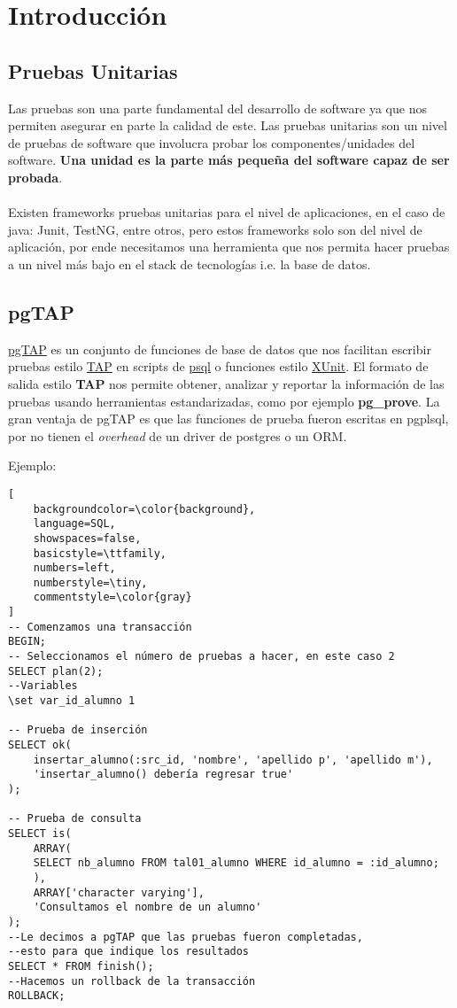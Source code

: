 \documentclass{article}
\begin{document}
\maketitle
\tableofcontents
\section{Introducción}

\subsection{Pruebas Unitarias}
Las pruebas son una parte fundamental del desarrollo de software ya que nos permiten asegurar en parte la calidad de este. Las pruebas unitarias son un nivel de pruebas de software que involucra probar los componentes/unidades del software. \textbf{Una unidad es la parte más pequeña del software capaz de ser probada}.\\\\
Existen frameworks pruebas unitarias para el nivel de aplicaciones, en el caso de java: Junit, TestNG, entre otros, pero estos frameworks solo son del nivel de aplicación, por ende necesitamos una herramienta que nos permita hacer pruebas a un nivel más bajo en el stack de tecnologías i.e. la base de datos.

\subsection{pgTAP}
\href{https://pgtap.org/documentation.html}{pgTAP} es un conjunto de funciones de base de datos que nos facilitan escribir pruebas estilo \href{https://en.wikipedia.org/wiki/Test_Anything_Protocol}{TAP} en scripts de \href{https://www.postgresql.org/docs/9.6/app-psql.html}{psql} o funciones estilo \href{https://en.wikipedia.org/wiki/XUnit}{XUnit}. El formato de salida estilo \textbf{TAP} nos permite obtener, analizar y reportar la información de las pruebas usando herramientas estandarizadas, como por ejemplo \textbf{pg\_prove}. La gran ventaja de pgTAP es que las funciones de prueba fueron escritas en pgplsql, por no tienen el \textit{overhead} de un driver de postgres o un ORM.

Ejemplo:

\begin{lstlisting}[
    backgroundcolor=\color{background},
    language=SQL,
    showspaces=false,
    basicstyle=\ttfamily,
    numbers=left,
    numberstyle=\tiny,
    commentstyle=\color{gray}
]
-- Comenzamos una transacción
BEGIN;
-- Seleccionamos el número de pruebas a hacer, en este caso 2
SELECT plan(2);
--Variables
\set var_id_alumno 1

-- Prueba de inserción
SELECT ok(
    insertar_alumno(:src_id, 'nombre', 'apellido p', 'apellido m'),
    'insertar_alumno() debería regresar true'
);

-- Prueba de consulta
SELECT is(
    ARRAY(
    SELECT nb_alumno FROM tal01_alumno WHERE id_alumno = :id_alumno;
    ),
    ARRAY['character varying'],
    'Consultamos el nombre de un alumno'
);
--Le decimos a pgTAP que las pruebas fueron completadas,
--esto para que indique los resultados
SELECT * FROM finish();
--Hacemos un rollback de la transacción
ROLLBACK;
\end{lstlisting}
\end{document}
